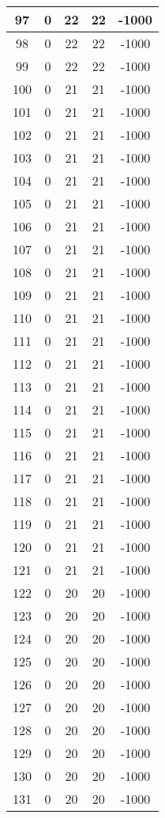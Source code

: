 \documentclass[letterpaper, 12pt]{article}
\begin{document}
\begin{longtable}{|c|c|c|c|c|}
\hline
97 & 0 & 22 & 22 & -1000 \\
\hline
98 & 0 & 22 & 22 & -1000 \\
\hline
99 & 0 & 22 & 22 & -1000 \\
\hline
100 & 0 & 21 & 21 & -1000 \\
\hline
101 & 0 & 21 & 21 & -1000 \\
\hline
102 & 0 & 21 & 21 & -1000 \\
\hline
103 & 0 & 21 & 21 & -1000 \\
\hline
104 & 0 & 21 & 21 & -1000 \\
\hline
105 & 0 & 21 & 21 & -1000 \\
\hline
106 & 0 & 21 & 21 & -1000 \\
\hline
107 & 0 & 21 & 21 & -1000 \\
\hline
108 & 0 & 21 & 21 & -1000 \\
\hline
109 & 0 & 21 & 21 & -1000 \\
\hline
110 & 0 & 21 & 21 & -1000 \\
\hline
111 & 0 & 21 & 21 & -1000 \\
\hline
112 & 0 & 21 & 21 & -1000 \\
\hline
113 & 0 & 21 & 21 & -1000 \\
\hline
114 & 0 & 21 & 21 & -1000 \\
\hline
115 & 0 & 21 & 21 & -1000 \\
\hline
116 & 0 & 21 & 21 & -1000 \\
\hline
117 & 0 & 21 & 21 & -1000 \\
\hline
118 & 0 & 21 & 21 & -1000 \\
\hline
119 & 0 & 21 & 21 & -1000 \\
\hline
120 & 0 & 21 & 21 & -1000 \\
\hline
121 & 0 & 21 & 21 & -1000 \\
\hline
122 & 0 & 20 & 20 & -1000 \\
\hline
123 & 0 & 20 & 20 & -1000 \\
\hline
124 & 0 & 20 & 20 & -1000 \\
\hline
125 & 0 & 20 & 20 & -1000 \\
\hline
126 & 0 & 20 & 20 & -1000 \\
\hline
127 & 0 & 20 & 20 & -1000 \\
\hline
128 & 0 & 20 & 20 & -1000 \\
\hline
129 & 0 & 20 & 20 & -1000 \\
\hline
130 & 0 & 20 & 20 & -1000 \\
\hline
131 & 0 & 20 & 20 & -1000 \\

\end{longtable}
\end{document}
